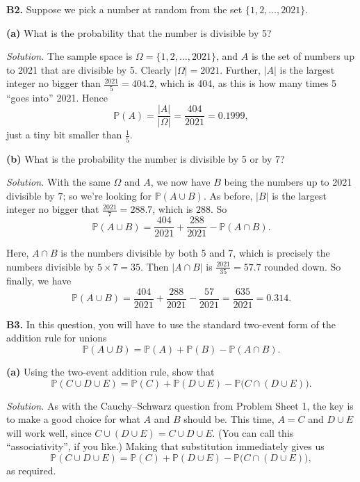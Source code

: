 \documentclass[
  a4paper,
]{book}
\theoremstyle{definition}
\theoremstyle{definition}
\theoremstyle{definition}
\theoremstyle{definition}
\theoremstyle{remark}
\begin{document}
\textbf{B2.} Suppose we pick a number at random from the set \(\{1, 2, \dots, 2021\}\).

\textbf{(a)} What is the probability that the number is divisible by 5?

\begin{myanswers}
\emph{Solution.} The sample space is \(\Omega = \{1, 2, \dots, 2021\}\), and \(A\) is the set of numbers up to 2021 that are divisible by 5. Clearly \(|\Omega| = 2021\). Further, \(|A|\) is the largest integer no bigger than \(\frac{2021}{5} = 404.2\), which is 404, as this is how many times 5 ``goes into'' 2021. Hence
\[ \mathbb P(A) = \frac{|A|}{|\Omega|} = \frac{404}{2021} = 0.1999 , \]
just a tiny bit smaller than \(\frac{1}{5}\).

\end{myanswers}

\textbf{(b)} What is the probability the number is divisible by 5 or by 7?

\begin{myanswers}
\emph{Solution.} With the same \(\Omega\) and \(A\), we now have \(B\) being the numbers up to 2021 divisible by \(7\); so we're looking for \(\mathbb P(A \cup B)\). As before, \(|B|\) is the largest integer no bigger that \(\frac{2021}{7} = 288.7\), which is \(288\). So
\[ \mathbb P(A \cup B) = \frac{404}{2021} + \frac{288}{2021} - \mathbb P(A\cap B) . \]

Here, \(A \cap B\) is the numbers divisible by both 5 and 7, which is precisely the numbers divisible by \(5 \times 7 = 35\). Then \(|A \cap B|\) is \(\frac{2021}{35} = 57.7\) rounded down. So finally, we have
\[ \mathbb P(A \cup B) = \frac{404}{2021} + \frac{288}{2021} - \frac{57}{2021} = \frac{635}{2021} = 0.314. \]

\end{myanswers}

\textbf{B3.} In this question, you will have to use the standard two-event form of the addition rule for unions
\[ \mathbb P(A \cup B) = \mathbb P(A) + \mathbb P(B) - \mathbb P(A \cap B) . \]

\textbf{(a)} Using the two-event addition rule, show that
\[ \mathbb P(C \cup D \cup E) = \mathbb P(C) + \mathbb P(D \cup E) - \mathbb P\big(C \cap (D \cup E)\big).  \]

\begin{myanswers}
\emph{Solution.} As with the Cauchy--Schwarz question from Problem Sheet 1, the key is to make a good choice for what \(A\) and \(B\) should be. This time, \(A = C\) and \(D \cup E\) will work well, since \(C \cup (D \cup E) = C \cup D \cup E\). (You can call this ``associativity'', if you like.) Making that substitution immediately gives us
\[ \mathbb P(C \cup D \cup E) = \mathbb P(C) + \mathbb P(D \cup E) - \mathbb P\big(C \cap (D \cup E)\big) ,  \]
as required.

\end{myanswers}
\end{document}

